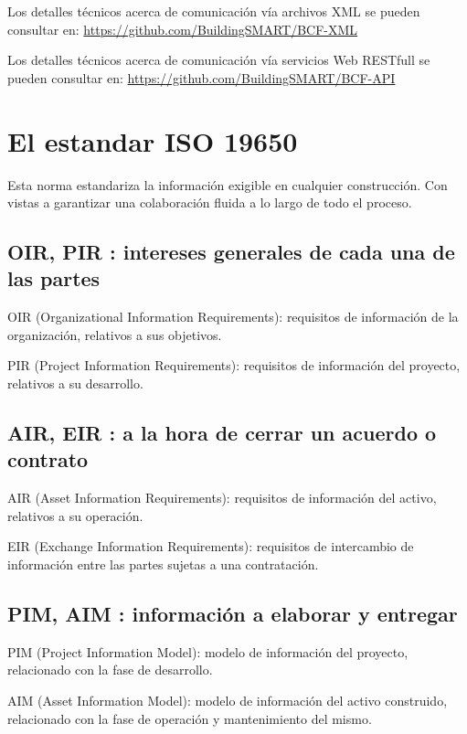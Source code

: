 \documentclass[spanish,12pt,a4paper,final,oneside]{book}
\begin{document}
Los detalles técnicos acerca de comunicación vía archivos XML se pueden consultar en: \url{https://github.com/BuildingSMART/BCF-XML}

Los detalles técnicos acerca de comunicación vía servicios Web RESTfull se pueden consultar en: \url{https://github.com/BuildingSMART/BCF-API}


\section{El estandar ISO 19650} \label{estandarISO19650}

Esta norma estandariza la información exigible en cualquier construcción. Con vistas a garantizar una colaboración fluida a lo largo de todo el proceso.

\subsection{OIR, PIR : intereses generales de cada una de las partes} 
OIR (Organizational Information Requirements): requisitos de información de la organización, relativos a sus objetivos.

PIR (Project Information Requirements): requisitos de información del proyecto, relativos a su desarrollo.

\subsection{AIR, EIR : a la hora de cerrar un acuerdo o contrato}
AIR (Asset Information Requirements): requisitos de información del activo, relativos a su operación.

EIR (Exchange Information Requirements): requisitos de intercambio de información entre las partes sujetas a una contratación.

\subsection{PIM, AIM : información a elaborar y entregar}
PIM (Project Information Model): modelo de información del proyecto, relacionado con la fase de desarrollo.

AIM (Asset Information Model): modelo de información del activo construido, relacionado con la fase de operación y mantenimiento del mismo.
\end{document}
